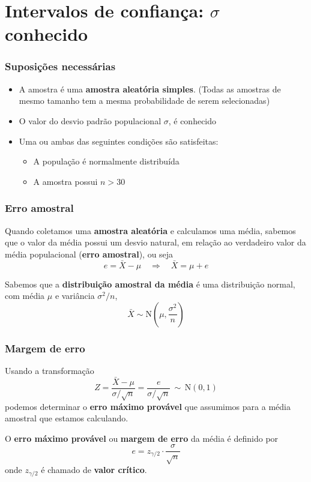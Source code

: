 \documentclass[11pt]{beamer}
\begin{document}
\section{Intervalos de confiança: \(\sigma\) conhecido}
\begin{frame}
\frametitle{Suposições necessárias}

\begin{itemize}
\item
  A amostra é uma \textbf{amostra aleatória simples}. (Todas as amostras
  de mesmo tamanho tem a mesma probabilidade de serem selecionadas)
\item
  O valor do desvio padrão populacional \(\sigma\), é conhecido
\item
  Uma ou ambas das seguintes condições são satisfeitas:

  \begin{itemize}
  \item
    A população é normalmente distribuída
  \item
    A amostra possui \(n > 30\)
  \end{itemize}
\end{itemize}
\end{frame}

\begin{frame}
\frametitle{Erro amostral}

Quando coletamos uma \textbf{amostra aleatória} e calculamos uma média,
sabemos que o valor da média possui um desvio natural, em relação ao
verdadeiro valor da média populacional (\textbf{erro amostral}), ou seja
\[
e = \bar{X} - \mu \quad \Rightarrow \quad \bar{X} = \mu + e
\]

Sabemos que a \textbf{distribuição amostral da média} é uma distribuição
normal, com média \(\mu\) e variância \(\sigma^2/n\), \[
\bar{X} \sim \text{N}\left(\mu, \frac{\sigma^2}{n}\right)
\]
\end{frame}

\begin{frame}
\frametitle{Margem de erro}

Usando a transformação \[
Z = \frac{\bar{X} - \mu}{\sigma/\sqrt{n}} =
\frac{e}{\sigma/\sqrt{n}} \, \sim \, \text{N}(0,1)
\] podemos determinar o \textbf{erro máximo provável} que assumimos para
a média amostral que estamos calculando.

O \textbf{erro máximo provável} ou \textbf{margem de erro} da média é
definido por \[
e = z_{\gamma/2} \cdot \frac{\sigma}{\sqrt{n}}
\] onde \(z_{\gamma/2}\) é chamado de \textbf{valor crítico}.
\end{frame}
\end{document}
